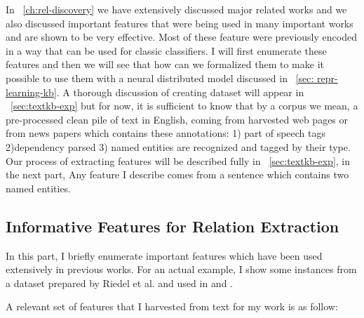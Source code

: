 In ~\autoref{ch:rel-discovery} we have extensively discussed major related works
and we also discussed important features that were being used in many important
works and are shown to be very effective. Most of these feature were previously
encoded in a way that can be used for classic classifiers. I will first
enumerate these features and then we will see that how can we formalized them
to make it possible to use them with a neural distributed model discussed in
~\autoref{sec: repr-learning-kb}. A thorough discussion of creating dataset will
appear in ~\autoref{sec:textkb-exp} but for now, it is sufficient to know that
by a corpus we mean, a pre-processed clean pile of text in English, coming from harvested web
pages or from news papers which contains these annotations: 1) part of speech
tags 2)dependency parsed 3) named entities are recognized and tagged by their
type. Our process of extracting features will be described fully in
~\autoref{sec:textkb-exp}, in the next part, Any feature I describe comes from a
sentence which contains two named entities. 

\subsection{Informative Features for Relation Extraction}
In this part, I briefly enumerate important features which have been used
extensively in previous works. For an actual example, I show some instances from
a dataset prepared by Riedel et al. and used in \cite{Riedel2013} and
\cite{Riedel2010a}. 

A relevant set of features that I harvested from text for my work is as follow:

